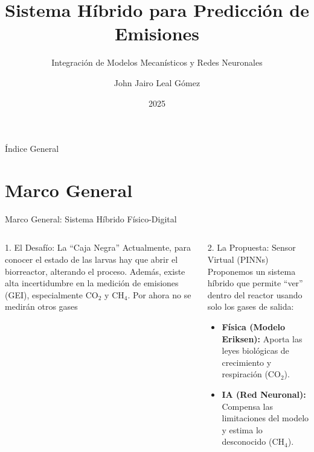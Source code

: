 \documentclass[aspectratio=169, 10pt]{beamer}
\title[Sistema Híbrido BSF]{Sistema Híbrido para Predicción de Emisiones}
\subtitle{Integración de Modelos Mecanísticos y Redes Neuronales}
\author{John Jairo Leal Gómez}
\institute[UNAL]{Universidad Nacional de Colombia}
\date{2025}
\begin{document}
\begin{frame}
    \titlepage
\end{frame}

\begin{frame}{Índice General}
    \tableofcontents
\end{frame}

\section{Marco General}

\begin{frame}{Marco General: Sistema Híbrido Físico-Digital}
    \begin{columns}[T]

        \begin{block}{1. El Desafío: La ``Caja Negra''}
            Actualmente, para conocer el estado de las larvas hay que abrir el biorreactor, alterando el proceso. Además, existe alta incertidumbre en la medición de emisiones (GEI), especialmente CO$_2$ y CH$_4$. Por ahora no se medirán otros gases
        \end{block}

        \begin{alertblock}{2. La Propuesta: Sensor Virtual (PINNs)}
            Proponemos un sistema híbrido que permite ``ver'' dentro del reactor usando solo los gases de salida:
            \vspace{0.2em}
            \begin{itemize}
                \item \textbf{Física (Modelo Eriksen):} Aporta las leyes biológicas de crecimiento y respiración (CO$_2$).
                \item \textbf{IA (Red Neuronal):} Compensa las limitaciones del modelo y estima lo desconocido (CH$_4$).
            \end{itemize}
        \end{alertblock}

        \centering
\end{columns}
\end{frame}
\end{document}
